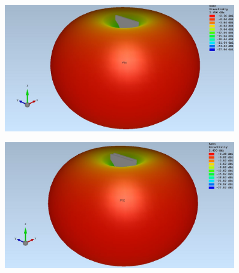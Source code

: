 \begin{figure}
	\begin{center}
		\includegraphics[width=0.9\textwidth]{content/bilder/Evaluation/Dipol/3D_Dipol_ABS.JPG}
		\label{fig:sim_Dipol_1ABS_3D}
	\end{center}
\end{figure}
\begin{figure}
	\begin{center}
		\includegraphics[width=0.9\textwidth]{content/bilder/Evaluation/Dipol/3D_Dipol_2ABS.JPG}
		\label{fig:sim_Dipol_2ABS_3D}
	\end{center}
\end{figure}
\clearpage


